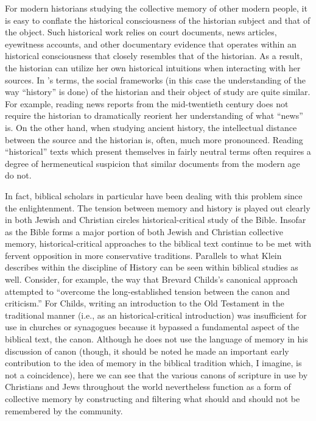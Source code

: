 For modern historians studying the collective memory of other modern
people, it is easy to conflate the historical consciousness of the
historian subject and that of the object. Such historical work relies on
court documents, news articles, eyewitness accounts, and other
documentary evidence that operates within an historical consciousness
that closely resembles that of the historian. As a result, the historian
can utilize her own historical intuitions when interacting with her
sources. In \halbwachs's terms, the social frameworks
(in this case the understanding of the way ``history'' is done) of the
historian and their object of study are quite similar. For example,
reading news reports from the mid-twentieth century does not require the
historian to dramatically reorient her understanding of what ``news''
is. On the other hand, when studying ancient history, the intellectual
distance between the source and the historian is, often, much more
pronounced. Reading ``historical'' texts which present themselves in
fairly neutral terms often requires a degree of hermeneutical suspicion
that similar documents from the modern age do not.

In fact, biblical scholars in particular have been dealing with this
problem since the enlightenment. The tension between memory and history
is played out clearly in both Jewish and Christian circles
\visavis historical-critical study of the Bible.
Insofar as the Bible forms a major portion of both Jewish and Christian
collective memory, historical-critical approaches to the biblical text
continue to be met with fervent opposition in more conservative
traditions. Parallels to what Klein describes within the discipline of
History can be seen within biblical studies as well. Consider, for
example, the way that Brevard Childs's canonical approach attempted to
``overcome the long-established tension between the canon and
criticism.''\autocite[45]{childs1979} For Childs, writing an
introduction to the Old Testament in the traditional manner (i.e., as an
historical-critical introduction) was insufficient for use in churches
or synagogues because it bypassed a fundamental aspect of the biblical
text, the canon. Although he does not use the language of memory in his
discussion of canon (though, it should be noted he made an important
early contribution to the idea of memory in the biblical tradition
which, I imagine, is not a coincidence\autocite{childs1962}), here we
can see that the various canons of scripture in use by Christians and
Jews throughout the world nevertheless function as a form of collective
memory by constructing and filtering what should and should not be
remembered by the community.

